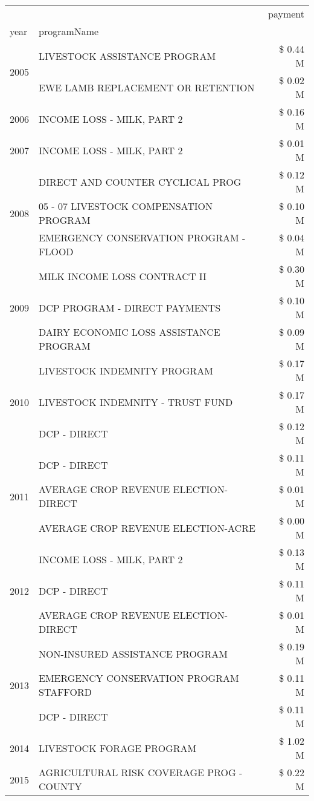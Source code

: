 \begin{tabular}{llr}
\toprule
 &  & payment \\
year & programName &  \\
\midrule
\multirow[t]{2}{*}{2005} & LIVESTOCK ASSISTANCE PROGRAM & \$ 0.44 M \\
 & EWE LAMB REPLACEMENT OR RETENTION & \$ 0.02 M \\
\cline{1-3}
2006 & INCOME LOSS - MILK, PART 2 & \$ 0.16 M \\
\cline{1-3}
2007 & INCOME LOSS - MILK, PART 2 & \$ 0.01 M \\
\cline{1-3}
\multirow[t]{3}{*}{2008} & DIRECT AND COUNTER CYCLICAL PROG & \$ 0.12 M \\
 & 05 - 07 LIVESTOCK COMPENSATION PROGRAM & \$ 0.10 M \\
 & EMERGENCY CONSERVATION PROGRAM - FLOOD & \$ 0.04 M \\
\cline{1-3}
\multirow[t]{3}{*}{2009} & MILK INCOME LOSS CONTRACT II & \$ 0.30 M \\
 & DCP PROGRAM - DIRECT PAYMENTS & \$ 0.10 M \\
 & DAIRY ECONOMIC LOSS ASSISTANCE PROGRAM & \$ 0.09 M \\
\cline{1-3}
\multirow[t]{3}{*}{2010} & LIVESTOCK INDEMNITY PROGRAM & \$ 0.17 M \\
 & LIVESTOCK INDEMNITY - TRUST FUND & \$ 0.17 M \\
 & DCP - DIRECT & \$ 0.12 M \\
\cline{1-3}
\multirow[t]{3}{*}{2011} & DCP - DIRECT & \$ 0.11 M \\
 & AVERAGE CROP REVENUE ELECTION-DIRECT & \$ 0.01 M \\
 & AVERAGE CROP REVENUE ELECTION-ACRE & \$ 0.00 M \\
\cline{1-3}
\multirow[t]{3}{*}{2012} & INCOME LOSS - MILK, PART 2 & \$ 0.13 M \\
 & DCP - DIRECT & \$ 0.11 M \\
 & AVERAGE CROP REVENUE ELECTION-DIRECT & \$ 0.01 M \\
\cline{1-3}
\multirow[t]{3}{*}{2013} & NON-INSURED ASSISTANCE PROGRAM & \$ 0.19 M \\
 & EMERGENCY CONSERVATION PROGRAM STAFFORD & \$ 0.11 M \\
 & DCP - DIRECT & \$ 0.11 M \\
\cline{1-3}
2014 & LIVESTOCK FORAGE PROGRAM & \$ 1.02 M \\
\cline{1-3}
\multirow[t]{2}{*}{2015} & AGRICULTURAL RISK COVERAGE PROG - COUNTY & \$ 0.22 M \\

\end{tabular}
